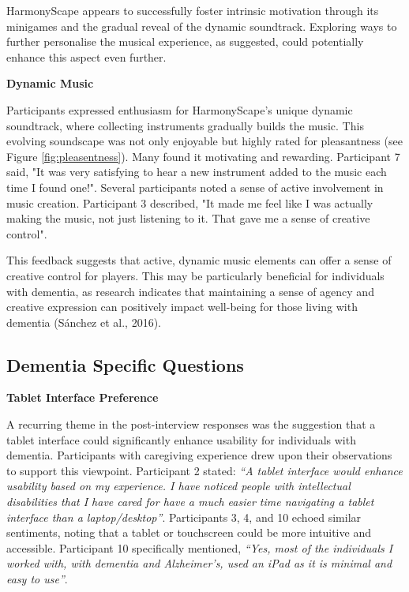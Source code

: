 \documentclass{l4proj}
\begin{document}
HarmonyScape appears to successfully foster intrinsic motivation through its minigames and the gradual reveal of the dynamic soundtrack. Exploring ways to further personalise the musical experience, as suggested, could potentially enhance this aspect even further.
\newline

\textbf{Dynamic Music}

Participants expressed enthusiasm for HarmonyScape's unique dynamic soundtrack, where collecting instruments gradually builds the music.  This evolving soundscape was not only enjoyable but highly rated for pleasantness (see Figure \ref{fig:pleasentness}). Many found it motivating and rewarding. Participant 7 said, "It was very satisfying to hear a new instrument added to the music each time I found one!". Several participants noted a sense of active involvement in music creation. Participant 3 described, "It made me feel like I was actually making the music, not just listening to it. That gave me a sense of creative control".

This feedback suggests that active, dynamic music elements can offer a sense of creative control for players. This may be particularly beneficial for individuals with dementia, as research indicates that maintaining a sense of agency and creative expression can positively impact well-being for those living with dementia (Sánchez et al., 2016).




\subsection{Dementia Specific Questions}

\textbf{Tablet Interface Preference}

A recurring theme in the post-interview responses was the suggestion that a tablet interface could significantly enhance usability for individuals with dementia. Participants with caregiving experience drew upon their observations to support this viewpoint. Participant 2 stated: \emph{“A tablet interface would enhance usability based on my experience. I have noticed people with intellectual disabilities that I have cared for have a much easier time navigating a tablet interface than a laptop/desktop”}. Participants 3, 4, and 10 echoed similar sentiments, noting that a tablet or touchscreen could be more intuitive and accessible. Participant 10 specifically mentioned, \emph{“Yes, most of the individuals I worked with, with dementia and Alzheimer's, used an iPad as it is minimal and easy to use”}. 
\end{document}
